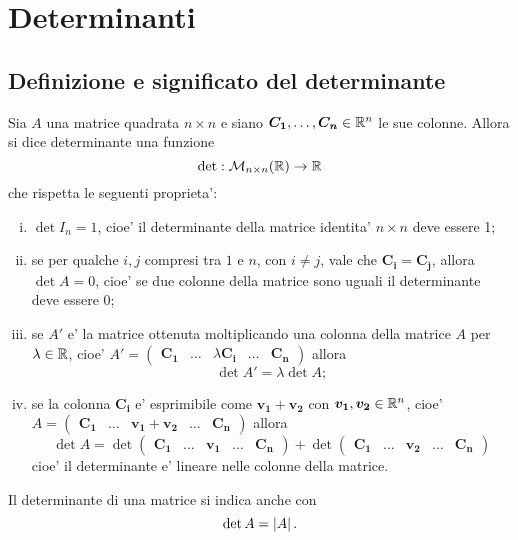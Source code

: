 
\chapter{Determinanti}

\section{Definizione e significato del determinante}

\begin{definition}
    Sia $A$ una matrice quadrata $n \times n$ e siano $\bm{C_1}, \dots, \bm{C_n} \in \mathbb{R}^n$ le sue colonne. Allora si dice determinante una funzione \[
        \det : \mathcal{M}_{n \times n}(\mathbb{R}) \to \mathbb{R} 
    \] che rispetta le seguenti proprieta':

    \begin{enumerate}[(i)]
        \item $\det I_n = 1$, cioe' il determinante della matrice identita' $n \times n$ deve essere 1;
        \item se per qualche $i, j$ compresi tra $1$ e $n$, con $i \neq j$, vale che $\bm{C_i} = \bm{C_j}$, allora $\det A = 0$, cioe' se due colonne della matrice sono uguali il determinante deve essere 0;
        \item se $A'$ e' la matrice ottenuta moltiplicando una colonna della matrice $A$ per $\lambda \in \mathbb{R}$, cioe' $A' = \begin{pmatrix} \bm{C_1} & \dots & \lambda \bm{C_i} & \dots & \bm{C_n} \end{pmatrix}$ allora \[\det A' = \lambda \det A;\]
        \item se la colonna $\bm{C_i}$ e' esprimibile come $\bm{v_1} + \bm{v_2}$ con $\bm{v_1}, \bm{v_2} \in \mathbb{R}^n$, cioe' $A = \begin{pmatrix} \bm{C_1} & \dots & \bm{v_1} + \bm{v_2} & \dots & \bm{C_n} \end{pmatrix}$
        allora \[
            \det A = \det \begin{pmatrix} \bm{C_1} & \dots & \bm{v_1} & \dots & \bm{C_n} \end{pmatrix} + \det \begin{pmatrix} \bm{C_1} & \dots & \bm{v_2} & \dots & \bm{C_n} \end{pmatrix} 
        \] cioe' il determinante e' lineare nelle colonne della matrice.
    \end{enumerate}
\end{definition}

Il determinante di una matrice si indica anche con \[
    \det A = \left|A\right|.    
\]

